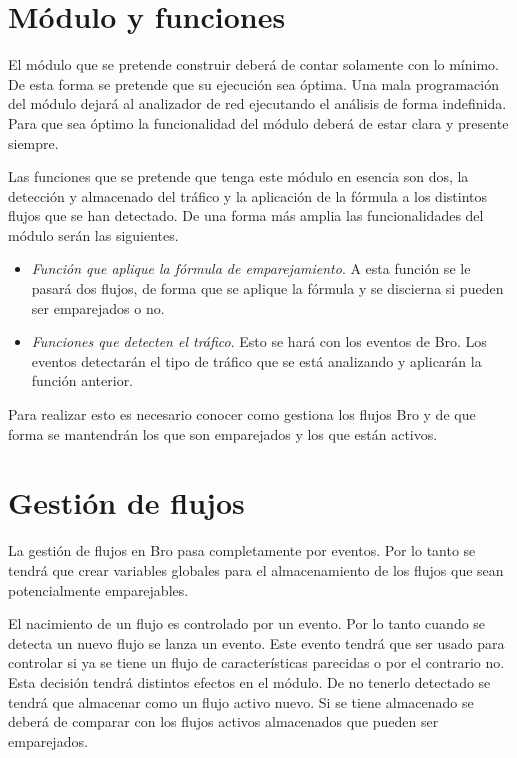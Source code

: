 \section{Módulo y funciones}

El módulo que se pretende construir deberá de contar solamente con lo mínimo. De esta forma se pretende que su 
ejecución sea óptima. Una mala programación del módulo dejará al analizador de red ejecutando el análisis de forma 
indefinida. Para que sea óptimo la funcionalidad del módulo deberá de estar clara y presente siempre.

\intro Las funciones que se pretende que tenga este módulo en esencia son dos, la detección y almacenado 
del tráfico y la aplicación de la fórmula a los distintos flujos que se han detectado. De una forma más amplia 
las funcionalidades del módulo serán las siguientes. 

\begin{itemize}
\item \textit{Función que aplique la fórmula de emparejamiento}. 
\intro A esta función se le pasará dos flujos, de forma que se aplique la fórmula y se discierna si pueden 
ser emparejados o no.
\item \textit{Funciones que detecten el tráfico}. 
\intro Esto se hará con los eventos de Bro. Los eventos detectarán el tipo de tráfico que se está analizando 
y aplicarán la función anterior.
\end{itemize}

\intro Para realizar esto es necesario conocer como gestiona los flujos Bro y de que forma se mantendrán los que 
son emparejados y los que están activos.

\section{Gestión de flujos}

La gestión de flujos en Bro pasa completamente por eventos. Por lo tanto se tendrá que crear variables globales 
para el almacenamiento de los flujos que sean potencialmente emparejables. 

\intro El nacimiento de un flujo es controlado por un evento. Por lo tanto cuando se detecta un nuevo flujo se 
lanza un evento. Este evento tendrá que ser usado para controlar si ya se tiene un flujo de características 
parecidas o por el contrario no. Esta decisión tendrá distintos efectos en el módulo. De no tenerlo detectado 
se tendrá que almacenar como un flujo activo nuevo. Si se tiene almacenado se deberá de comparar con los flujos 
activos almacenados que pueden ser emparejados.

